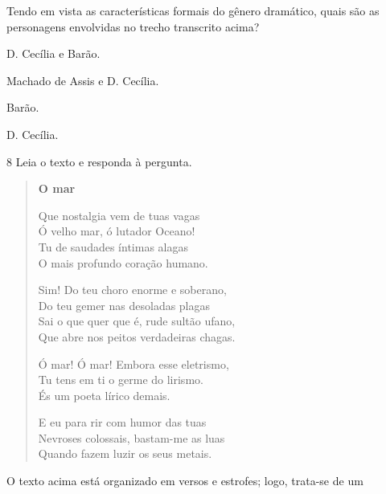 Tendo em vista as características formais do gênero dramático, quais são
as personagens envolvidas no trecho transcrito acima?

\begin{multicols}{2}
\begin{escolha}

  \item D. Cecília e Barão.

  \item Machado de Assis e D. Cecília.

  \item Barão.

  \item D. Cecília.

\end{escolha} 
\end{multicols}


\num{8} Leia o texto e responda à pergunta.

\begin{myquote}
\begin{verse}
\textbf{O mar}

Que nostalgia vem de tuas vagas\\
Ó velho mar, ó lutador Oceano!\\
Tu de saudades íntimas alagas\\
O mais profundo coração humano.

Sim! Do teu choro enorme e soberano,\\
Do teu gemer nas desoladas plagas\\
Sai o que quer que é, rude sultão ufano,\\
Que abre nos peitos verdadeiras chagas.

Ó mar! Ó mar! Embora esse eletrismo,\\
Tu tens em ti o germe do lirismo.\\
És um poeta lírico demais.

E eu para rir com humor das tuas\\
Nevroses colossais, bastam-me as luas\\
Quando fazem luzir os seus metais.
\end{verse}

\end{myquote}

O texto acima está organizado em versos e estrofes; logo, trata-se de
um

